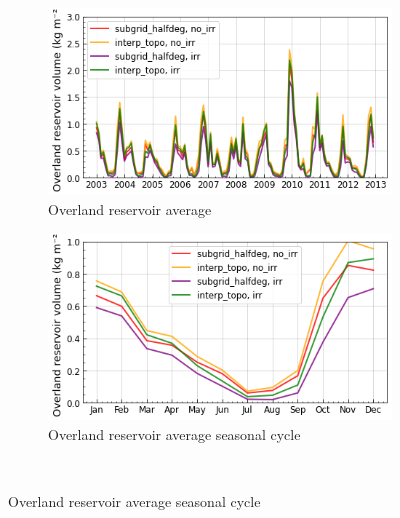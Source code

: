 \begin{figure}[htbp]
    \begin{subfigure}[b]{0.48\textwidth}
        \caption{Overland reservoir average}
        \includegraphics[width=\textwidth]{images/chap3/time_series/fastr_time_series.png}
    \end{subfigure}
    \begin{subfigure}[b]{0.48\textwidth}
        \caption{Overland reservoir average seasonal cycle}
        \includegraphics[width=\textwidth]{images/chap3/time_series/fastr_seasonal_cycle.png}
    \end{subfigure} \\
    

\end{figure}
